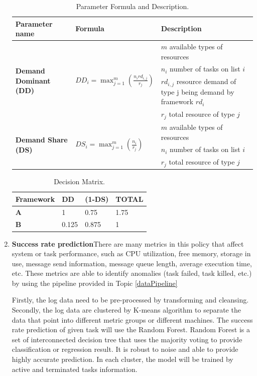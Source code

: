 \documentclass[12pt,oneside,openright,a4paper]{cpe-english-project}
\begin{document}
\begin{enumerate}
\begin{table}[!h]
\caption{Parameter Formula and Description.}\label{tbl:Parameter}
\begin{tabular}{@{}|p{}|p{}|p{}|}
\hline
\textbf{Parameter name} & \textbf{Formula} & \textbf{Description} \\ 
\hline
\multirow{4}{*}{\textbf{Demand Dominant (DD)}} & \multirow{4}{*}{$DD_i = \max_{j=1}^{m}(\frac{n_ird_{i,j}}{r_j})$} & $m$ available types of resources\\ 
\cline{3-3} & & $n_i$ number of tasks on list $i$\\ 
\cline{3-3} & & $rd_{i,j}$ resource demand of type j being demand by framework $rd_i $\\ 
\cline{3-3} & & $r_j$ total resource of type $j$\\ 
\hline
\multirow{3}{*}{\textbf{Demand Share (DS)}} & \multirow{3}{*}{$DS_i = \max_{j=1}^{m}(\frac{n_i}{r_j})$} & $m$ available types of resources \\ 
\cline{3-3} & & $n_i$ number of tasks on list $i$ \\
\cline{3-3} & & $r_j$ total resource of type $j$ \\ 
\hline
\end{tabular}
\end{table}

\begin{table}[!h]
\caption{Decision Matrix.}\label{tbl:DecisionMatrix}
\begin{tabular}{|l|l|l|l|}
\hline
\textbf{Framework} & \textbf{DD} & \textbf{(1-DS)} & \textbf{TOTAL}\\
\hline
\textbf{A} & 1 & 0.75 & 1.75\\
\hline
\textbf{B} & 0.125 & 0.875 & 1\\
\hline
\end{tabular}
\end{table}

\item \textbf{Success rate prediction}There are many metrics in this policy that affect system or task performance, such as CPU utilization, free memory, storage in use, message send information, message queue length, average execution time, etc. These metrics are able to identify anomalies (task failed, task killed, etc.) by using the pipeline provided in Topic \ref{dataPipeline}

Firstly, the log data need to be pre-processed by transforming and cleansing.  Secondly, the log data are clustered by K-means algorithm to separate the data that point into different metric groups or different machines.  The success rate prediction of given task will use the Random Forest. Random Forest is a set of interconnected decision tree that uses the majority voting to provide classification or regression result. It is robust to noise and able to provide highly accurate prediction. \cite{AdaptiveScheduling} In each cluster, the model will be trained by active and terminated tasks information. 


\end{enumerate}
\end{document}
